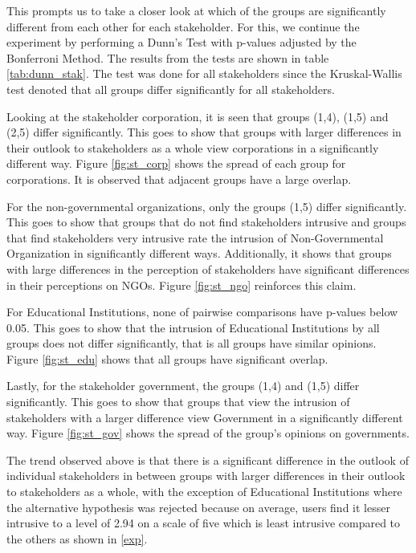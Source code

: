 This prompts us to take a closer look at which of the groups are significantly different from each other for each stakeholder. For this, we continue the experiment by performing a Dunn's Test with p-values adjusted by the Bonferroni Method. The results from the tests are shown in table \ref{tab:dunn_stak}. The test was done for all stakeholders since the Kruskal-Wallis test denoted that all groups differ significantly for all stakeholders. 

Looking at the stakeholder corporation, it is seen that groups (1,4), (1,5) and (2,5) differ significantly. This goes to show that groups with larger differences in their outlook to stakeholders as a whole view corporations in a significantly different way. Figure \ref{fig:st_corp} shows the spread of each group for corporations. It is observed that adjacent groups have a large overlap.

For the non-governmental organizations, only the groups (1,5) differ significantly. This goes to show that groups that do not find stakeholders intrusive and groups that find stakeholders very intrusive rate the intrusion of Non-Governmental Organization in significantly different ways. Additionally, it shows that groups with large differences in the perception of stakeholders have significant differences in their perceptions on NGOs. Figure \ref{fig:st_ngo} reinforces this claim.

For Educational Institutions, none of pairwise comparisons have p-values below 0.05. This goes to show that the intrusion of Educational Institutions by all groups does not differ significantly, that is all groups have similar opinions. Figure \ref{fig:st_edu} shows that all groups have significant overlap.

Lastly, for the stakeholder government, the groups (1,4) and (1,5) differ significantly. This goes to show that groups that view the intrusion of stakeholders with a larger difference view Government in a significantly different way. Figure \ref{fig:st_gov} shows the spread of the group's opinions on governments. 

The trend observed above is that there is a significant difference in the outlook of individual stakeholders in between groups with larger differences
in their outlook to stakeholders as a whole, with the exception of Educational Institutions where the alternative hypothesis was rejected because on average, users find it lesser intrusive to a level of 2.94 on a scale of five which is least intrusive compared to the others as shown in \ref{exp}.

